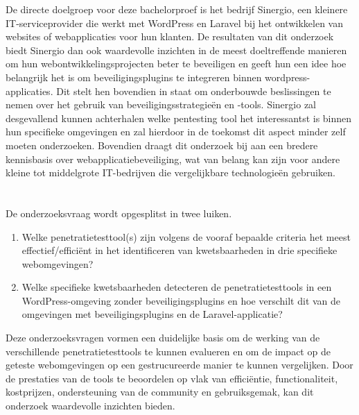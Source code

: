 De directe doelgroep voor deze bachelorproef is het bedrijf Sinergio, een kleinere IT-serviceprovider die  
werkt met WordPress en Laravel bij het ontwikkelen van websites of webapplicaties voor hun klanten. De resultaten van dit 
onderzoek biedt Sinergio dan ook waardevolle inzichten in de meest doeltreffende manieren om hun webontwikkelingsprojecten beter 
te beveiligen en geeft hun een idee hoe belangrijk het is om beveiligingsplugins te integreren binnen wordpress-applicaties. 
Dit stelt hen bovendien in staat om onderbouwde beslissingen te nemen over het gebruik van 
beveiligingsstrategieën en -tools. Sinergio zal desgevallend kunnen achterhalen welke pentesting tool het interessantst is 
binnen hun specifieke omgevingen en zal hierdoor in de toekomst dit aspect minder zelf moeten onderzoeken.
Bovendien draagt dit onderzoek bij aan een bredere kennisbasis over webapplicatiebeveiliging, 
wat van belang kan zijn voor andere kleine tot middelgrote IT-bedrijven die vergelijkbare technologieën gebruiken.

\section{}%
\label{sec:onderzoeksvraag}
De onderzoeksvraag wordt opgesplitst in twee luiken.
\begin{enumerate}
  \item Welke penetratietesttool(s) zijn volgens de vooraf bepaalde criteria het meest effectief/efficiënt in het identificeren van kwetsbaarheden in drie specifieke webomgevingen?
  \item Welke specifieke kwetsbaarheden detecteren de penetratietesttools in een WordPress-omgeving zonder beveiligingsplugins en hoe verschilt dit van de omgevingen met beveiligingsplugins en de Laravel-applicatie? 
\end{enumerate}
Deze onderzoeksvragen vormen een duidelijke basis om de werking van de verschillende penetratietesttools te kunnen evalueren 
en om de impact op de geteste webomgevingen op een gestrucureerde manier te kunnen vergelijken. Door de prestaties van de 
tools te beoordelen op vlak van efficiëntie, functionaliteit, kostprijzen, ondersteuning van de community en gebruiksgemak, 
kan dit onderzoek waardevolle inzichten bieden.

